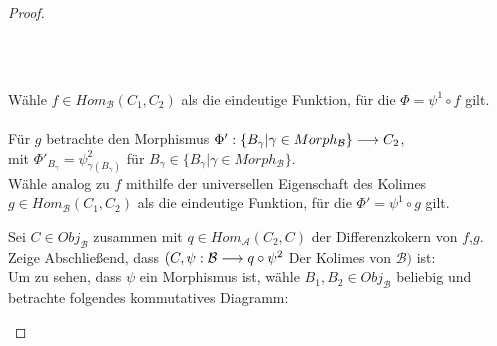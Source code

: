 \documentclass[10pt,a4paper]{report}
\newcommand{\functionfront}[3]{\nolinebreak{#1:#2 \longrightarrow #3}}
\begin{document}
\begin{proof}
\begin{center}
\ \\
\ \\
Wähle $f \in Hom_{\mathcal{B}}(C_1,C_2)$ als die eindeutige Funktion, für die $\Phi = \psi^1 \circ f$ gilt.\\
\ \\
Für $g$ betrachte den Morphismus $\functionfront{\Phi'}{\lbrace B_{\gamma} \vert \gamma \in Morph_{\mathcal{B}}\rbrace}{C_2}$,\\
mit $\Phi'_{B_{\gamma}} = \psi^2_{\gamma(B_{\gamma})}$ für $B_{\gamma} \in \lbrace B_{\gamma} \vert \gamma \in Morph_{\mathcal{B}}\rbrace$.\\
Wähle analog zu $f$ mithilfe der universellen Eigenschaft des Kolimes $g \in Hom_{\mathcal{B}}(C_1,C_2)$ als die eindeutige Funktion, für die $\Phi' = \psi^1 \circ g$ gilt.
\end{center}
Sei $C \in Obj_{\mathcal{B}}$ zusammen mit $q \in Hom_{\mathcal{A}}(C_2,C)$ der Differenzkokern von $f$,$g$.\\
Zeige Abschließend, dass $(C, \functionfront{\psi}{\mathcal{B}}{q \circ \psi^2}$ Der Kolimes von $\mathcal{B})$ ist:\\
Um zu sehen, dass $\psi$ ein Morphismus ist, wähle $B_1,B_2 \in Obj_{\mathcal{B}}$ beliebig und betrachte folgendes kommutatives Diagramm:
\begin{center}
\end{center}

\end{proof}
\end{document}
